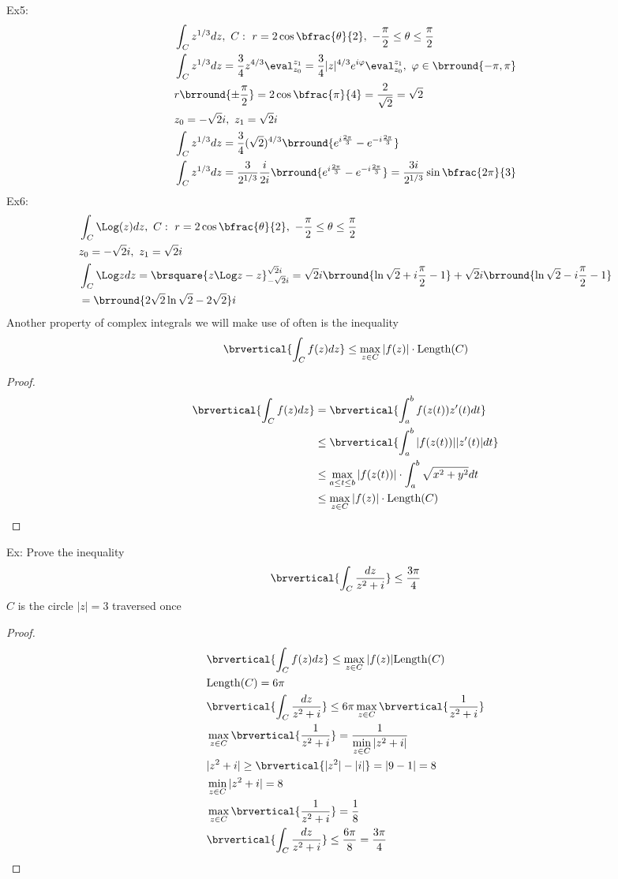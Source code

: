 Ex5:
\begin{align*}
    &\int_C z^{1/3}dz,\ C:\ r=2\cos\bfrac{\theta}{2},\ -\frac{\pi}{2}\leq\theta\leq\frac{\pi}{2}\\
    &\int_Cz^{1/3}dz=\frac{3}{4}z^{4/3}\eval_{z_0}^{z_1}=\frac{3}{4}|z|^{4/3}e^{i\varphi}\eval_{z_0}^{z_1},\ \varphi\in\brround{-\pi,\pi}\\
    &r\brround{\pm\frac{\pi}{2}}=2\cos\bfrac{\pi}{4}=\frac{2}{\sqrt{2}}=\sqrt{2}\\
    &z_0=-\sqrt{2}i,\ z_1=\sqrt{2}i\\
    &\int_C z^{1/3}dz=\frac{3}{4}(\sqrt{2})^{4/3}\brround{e^{i\frac{2\pi}{3}}-e^{-i\frac{2\pi}{3}}}\\
    &\int_C z^{1/3}dz=\frac{3}{2^{1/3}}\frac{i}{2i}\brround{e^{i\frac{2\pi}{3}}-e^{-i\frac{2\pi}{3}}}=\frac{3i}{2^{1/3}}\sin\bfrac{2\pi}{3}
\end{align*}
Ex6:
\begin{align*}
    &\int_C\Log(z)dz,\ C:\ r=2\cos\bfrac{\theta}{2},\ -\frac{\pi}{2}\leq\theta\leq\frac{\pi}{2}\\
    &z_0=-\sqrt{2}i,\ z_1=\sqrt{2}i\\
    &\int_C\Log zdz=\brsquare{z\Log z-z}_{-\sqrt{2}i}^{\sqrt{2}i}=\sqrt{2}i\brround{\ln\sqrt{2}+i\frac{\pi}{2}-1}+\sqrt{2}i\brround{\ln\sqrt{2}-i\frac{\pi}{2}-1}\\
    &=\brround{2\sqrt{2}\ln\sqrt{2}-2\sqrt{2}}i
\end{align*}
Another property of complex integrals we will make use of often is the inequality
\[\brvertical{\int_C f(z)dz}\leq \max_{z\in C}|f(z)|\cdot\text{Length}(C)\]
\begin{proof}
\begin{align*}
    \brvertical{\int_C f(z)dz}&=\brvertical{\int_a^b f(z(t))z'(t)dt}\\
    &\leq\brvertical{\int_a^b |f(z(t))||z'(t)|dt}\\
    &\leq\max_{a\leq t\leq b}|f(z(t))|\cdot\int_a^b\sqrt{x^2+y^2}dt\\
    &\leq\max_{z\in C}|f(z)|\cdot\text{Length}(C)
\end{align*}
\end{proof}
Ex: Prove the inequality
\[
\brvertical{\int_C\frac{dz}{z^2+i}}\leq\frac{3\pi}{4}
\]
$C$ is the circle $|z|=3$ traversed once
\begin{proof}
    \begin{align*}
        &\brvertical{\int_Cf(z)dz}\leq\max_{z\in C}|f(z)|\mathrm{Length}(C)\\
        &\mathrm{Length}(C)=6\pi\\
        &\brvertical{\int_C\frac{dz}{z^2+i}}\leq6\pi\max_{z\in C}\brvertical{\frac{1}{z^2+i}}\\
        &\max_{z\in C}\brvertical{\frac{1}{z^2+i}}=\frac{1}{\min\limits_{z\in C}|z^2+i|}\\
        &|z^2+i|\geq\brvertical{|z^2|-|i|}=|9-1|=8\\
        &\min_{z\in C}|z^2+i|=8\\
        &\max_{z\in C}\brvertical{\frac{1}{z^2+i}}=\frac{1}{8}\\
        &\brvertical{\int_C\frac{dz}{z^2+i}}\leq\frac{6\pi}{8}=\frac{3\pi}{4}
    \end{align*}
\end{proof}
